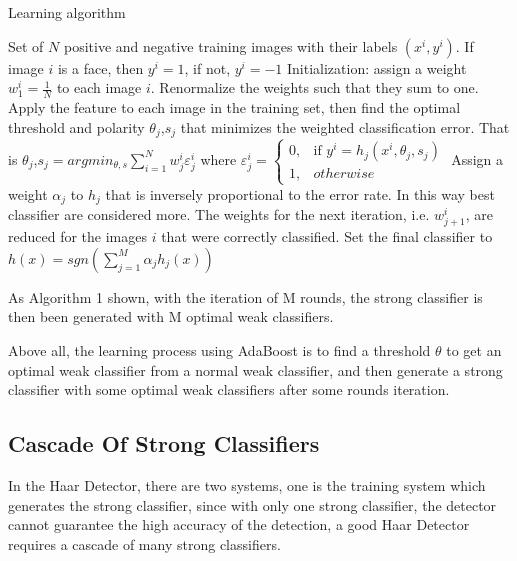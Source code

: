 \documentclass[conference]{IEEEtran}
\begin{document}
\begin{algorithm}
  \caption{Learning algorithm}
  \begin{algorithmic}[1]
    \renewcommand{\algorithmicrequire}{\textbf{Input:}}
    \REQUIRE Set of $N$ positive and negative training images with their labels $(x^i, y^i)$. If image $i$ is a face, then $y^i=1$, if not, $y^i=-1$
    \STATE Initialization: assign a weight $w^{i}_{1}=\frac{1}{N}$ to each image $i$.
    \STATE Renormalize the weights such that they sum to one.
    \STATE Apply the feature to each image in the training set, then find the optimal threshold and polarity $\theta_{j}$,$s_{j}$ that minimizes the weighted classification error. That is $\theta_{j}$,$s_{j}=arg min_{\theta,s}\sum\limits^{N}_{i=1}w^{i}_{j}\varepsilon^{i}_{j}$ where $\varepsilon^{i}_{j}=\begin{cases}
      0, & \text{if } y^{i} = h_{j}(x^{i},\theta_{j},s_{j}) \\
      1, & otherwise
      \end{cases}$
    \STATE Assign a weight $\alpha_{j}$ to $h_{j}$ that is inversely proportional to the error rate. In this way best classifier are considered more.
    \STATE The weights for the next iteration, i.e. $w^{i}_{j+1}$, are reduced for the images $i$ that were correctly classified.
    \ENDFOR
    \STATE Set the final classifier to $h(x)=sgn\left(\sum\limits^{M}_{j=1}\alpha_{j}h_{j}(x) \right)$
  \end{algorithmic}
\end{algorithm}

As Algorithm 1 shown, with the iteration of M rounds, the strong classifier is then been generated with M optimal weak classifiers.

Above all, the learning process using AdaBoost is to find a threshold $\theta$ to get an optimal weak classifier from a normal weak classifier, and then generate a strong classifier with some optimal weak classifiers after some rounds iteration.

\subsection{Cascade Of Strong Classifiers}
In the Haar Detector, there are two systems, one is the training system which generates the strong classifier, since with only one strong classifier, the detector cannot guarantee the high accuracy of the detection, a good Haar Detector requires a cascade of many strong classifiers.
\end{document}
